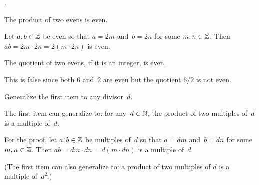 \documentclass{ibl}  %
\begin{document}
\begin{problem} 
\pord.
\begin{exes}
\begin{exercise}
  The product of two evens is even.
\end{exercise}
\begin{answer}
  Let $a,b\in\mathbb{Z}$ be even
  so that $a=2m$ and~$b=2n$ for some $m,n\in\mathbb{Z}$.
  Then $ab=2m\cdot 2n=2(m\cdot 2n)$ is even.  
\end{answer}

\begin{exercise}
  The quotient of two evens, if it is an integer, is even.
\end{exercise}
\begin{answer}
  This is false since both $6$ and~$2$ are even but the quotient $6/2$
  is not even.
\end{answer}

\begin{exercise}[\midlength]
  Generalize the first item to any divisor~$d$.  
\end{exercise}
\begin{answer}
  The first item can generalize to: for any~$d\in\mathbb{N}$, 
  the product of two multiples of~$d$ is a multiple of~$d$.

  For the proof,  let $a,b\in\mathbb{Z}$ be multiples of~$d$
  so that $a=dm$ and~$b=dn$ for some $m,n\in\mathbb{Z}$.
  Then $ab=dm\cdot dn=d(m\cdot dn)$ is a multiple of~$d$.

  (The first item can also generalize to: a product of two multiples of
  $d$ is a multiple of~$d^2$.)
\end{answer}


\end{exes}
\end{problem}
\end{document}
